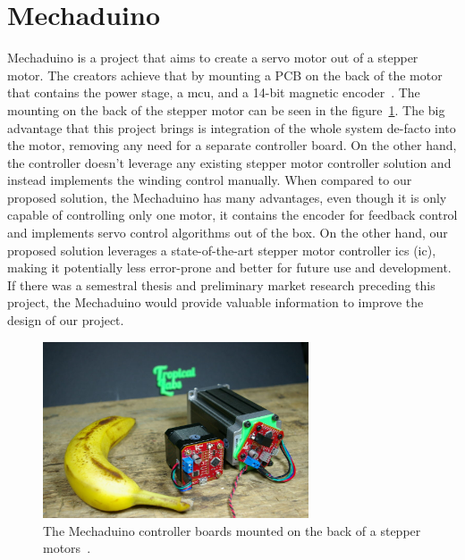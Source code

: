 \section{Mechaduino}
\label{sec:mechaduino}
Mechaduino is a project that aims to create a servo motor out of a stepper motor.
The creators achieve that by mounting a PCB on the back of the motor that contains the power stage, a \acs{mcu}, and a 14-bit magnetic encoder~\cite{tropical_labs_mechaduino_2021}.
The mounting on the back of the stepper motor can be seen in the figure~\ref{fig:mechaduino}.
The big advantage that this project brings is integration of the whole system de-facto into the motor, removing any need for a separate controller board.
On the other hand, the controller doesn't leverage any existing stepper motor controller solution and instead implements the winding control manually.
When compared to our proposed solution, the Mechaduino has many advantages, even though it is only capable of controlling only one motor, it contains the encoder for feedback control and implements servo control algorithms out of the box.
On the other hand, our proposed solution leverages a state-of-the-art stepper motor controller \acs{ic}s (\acl{ic}), making it potentially less error-prone and better for future use and development.
If there was a semestral thesis and preliminary market research preceding this project, the Mechaduino would provide valuable information to improve the design of our project.

\begin{figure}[H]
    \centering
    \includegraphics[width=0.7\textwidth]{obrazky/mechaduino}
    \caption{The Mechaduino controller boards mounted on the back of a stepper motors~\cite{tropical_labs_mechaduino_2021}.}
    \label{fig:mechaduino}
\end{figure}

